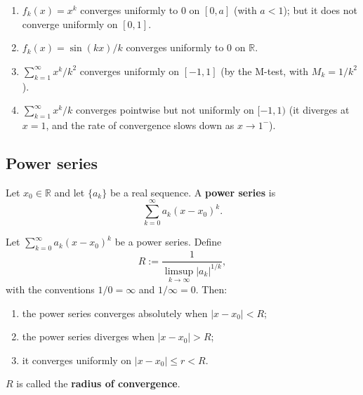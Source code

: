 \begin{example}\label{ex:uniform_convergence_examples}
\begin{enumerate}[label=(\roman*)]
    \item $f_k(x) = x^k$ converges uniformly to $0$ on $[0, a]$ (with $a < 1$); but it does not converge uniformly on $[0, 1]$.
    \item $f_k(x) = \sin(kx)/k$ converges uniformly to $0$ on $\mathbb{R}$.
    \item $\sum_{k=1}^{\infty} x^k / k^2$ converges uniformly on $[-1, 1]$ (by the M-test, with $M_k = 1/k^2$).
    \item $\sum_{k=1}^{\infty} x^k / k$ converges pointwise but not uniformly on $[-1, 1)$ (it diverges at $x = 1$, and the rate of convergence slows down as $x \to 1^-$).
\end{enumerate}
\end{example}

\subsection{Power series}

\begin{definition}\label{def:power_series_ra}
Let $x_0 \in \mathbb{R}$ and let $\{a_k\}$ be a real sequence. A \textbf{power series} is
\[
\sum_{k=0}^{\infty} a_k (x - x_0)^k.
\]
\end{definition}

\begin{theorem}\label{thm:cauchy_hadamard_ra}
Let $\sum_{k=0}^{\infty} a_k (x - x_0)^k$ be a power series. Define
\[
R := \frac{1}{\limsup_{k \to \infty} |a_k|^{1/k}},
\]
with the conventions $1/0 = \infty$ and $1/\infty = 0$. Then:
\begin{enumerate}[label=(\roman*)]
    \item the power series converges absolutely when $|x - x_0| < R$;
    \item the power series diverges when $|x - x_0| > R$;
    \item it converges uniformly on $|x - x_0| \le r < R$.
\end{enumerate}
$R$ is called the \textbf{radius of convergence}.
\end{theorem}

